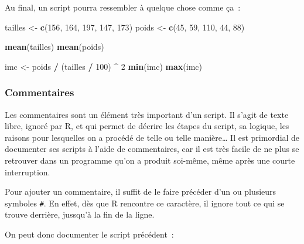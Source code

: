 \documentclass[
  12pt,
]{book}
\newenvironment{Shaded}{\begin{snugshade}}{\end{snugshade}}
\newcommand{\DecValTok}[1]{\textcolor[rgb]{0.00,0.00,0.81}{#1}}
\newcommand{\KeywordTok}[1]{\textcolor[rgb]{0.13,0.29,0.53}{\textbf{#1}}}
\newcommand{\NormalTok}[1]{#1}
\newcommand{\OperatorTok}[1]{\textcolor[rgb]{0.81,0.36,0.00}{\textbf{#1}}}
\newcommand{\StringTok}[1]{\textcolor[rgb]{0.31,0.60,0.02}{#1}}
\begin{document}
Au final, un script pourra ressembler à quelque chose comme ça~:

\begin{Shaded}
\begin{Highlighting}[]
\NormalTok{tailles \textless{}{-}}\StringTok{ }\KeywordTok{c}\NormalTok{(}\DecValTok{156}\NormalTok{, }\DecValTok{164}\NormalTok{, }\DecValTok{197}\NormalTok{, }\DecValTok{147}\NormalTok{, }\DecValTok{173}\NormalTok{)}
\NormalTok{poids \textless{}{-}}\StringTok{ }\KeywordTok{c}\NormalTok{(}\DecValTok{45}\NormalTok{, }\DecValTok{59}\NormalTok{, }\DecValTok{110}\NormalTok{, }\DecValTok{44}\NormalTok{, }\DecValTok{88}\NormalTok{)}

\KeywordTok{mean}\NormalTok{(tailles)}
\KeywordTok{mean}\NormalTok{(poids)}

\NormalTok{imc \textless{}{-}}\StringTok{ }\NormalTok{poids }\OperatorTok{/}\StringTok{ }\NormalTok{(tailles }\OperatorTok{/}\StringTok{ }\DecValTok{100}\NormalTok{) }\OperatorTok{\^{}}\StringTok{ }\DecValTok{2}
\KeywordTok{min}\NormalTok{(imc)}
\KeywordTok{max}\NormalTok{(imc)}
\end{Highlighting}
\end{Shaded}

\hypertarget{commentaires}{%
\subsubsection{Commentaires}\label{commentaires}}

Les commentaires sont un élément très important d'un script. Il s'agit de texte libre, ignoré par R, et qui permet de décrire les étapes du script, sa logique, les raisons pour lesquelles on a procédé de telle ou telle manière\ldots{} Il est primordial de documenter ses scripts à l'aide de commentaires, car il est très facile de ne plus se retrouver dans un programme qu'on a produit soi-même, même après une courte interruption.

Pour ajouter un commentaire, il suffit de le faire précéder d'un ou plusieurs symboles \texttt{\#}. En effet, dès que R rencontre ce caractère, il ignore tout ce qui se trouve derrière, jussqu'à la fin de la ligne.

On peut donc documenter le script précédent~:
\end{document}

